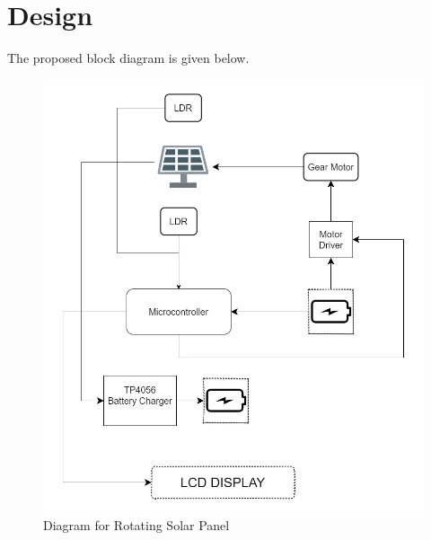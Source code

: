 \section*{Design}
The proposed block diagram is given below. 

\begin{figure}[H]
\centering
\includegraphics[scale=0.6]{diagramv2.jpg} %
\caption{Diagram for Rotating Solar Panel}  %
\label{bf1}
\end{figure}